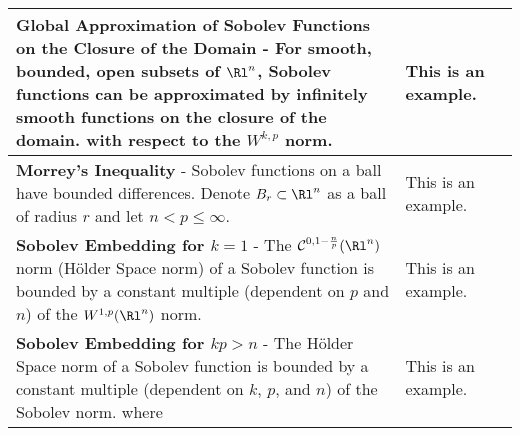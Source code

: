 \begin{longtable}{|*{3}{>{\centering\arraybackslash}p{}|}}
            \textbf{Global Approximation of Sobolev Functions on the Closure of the Domain} - For smooth, bounded, open subsets of $\Rl^n$, Sobolev functions can be approximated by infinitely smooth functions on the closure of the domain. \newline {$\!\begin{gathered} \mathcal{C}^\infty(\overline{\Omega}) \qquad \text{is dense in} \qquad W^{k,p}(\Omega) \end{gathered}$} \newline with respect to the $W^{k,p}$ norm. & This is an example. \\[6pt] \hline
            
            \textbf{Morrey's Inequality} - Sobolev functions on a ball have bounded differences.  Denote $B_r \subset \Rl^n$ as a ball of radius $r$ and let $n < p \leq \infty$. \newline {$\!\begin{gathered} \abs{u(x) - u(y)} \leq C \abs{x - y}^{1 - \frac{n}{p}}\norm{D u}_{L^p(B_r)} \end{gathered}$} & This is an example. \\[6pt] \hline
            
            \textbf{Sobolev Embedding for $k = 1$} - The $\mathcal{C}^{0,1 - \frac{n}{p}}(\Rl^n)$ norm (H\"{o}lder Space norm) of a Sobolev function is bounded by a constant multiple (dependent on $p$ and $n$) of the $W^{1,p}(\Rl^n)$ norm. \newline {$\!\begin{gathered} \norm{u}_{\mathcal{C}^{0, 1 - \frac{n}{p}}(\Rl^n)} \leq C\norm{u}_{W^{1,p}(\Rl^n)} \end{gathered}$} & This is an example. \\[6pt] \hline
                        
            \textbf{Sobolev Embedding for $kp > n$} - The H\"{o}lder Space norm of a Sobolev function is bounded by a constant multiple (dependent on $k$, $p$, and $n$) of the Sobolev norm. \newline {$\!\begin{gathered} \norm{u}_{\mathcal{C}^{k - \qty[\frac{n}{p}] - 1, \gamma}(\Rl^n)} \leq C \norm{u}_{W^{k,p}(\Rl^n)} \end{gathered}$} \newline where \newline {$\!\begin{gathered} \gamma = \begin{cases}\qty[\dfrac{n}{p}] + 1 - \dfrac{n}{p} & \text{ if } \dfrac{n}{p} \not\in \mathbb{N},\\[0.4cm] \text{any } \alpha \in \Rl \cap (0,1) & \text{ if } \dfrac{n}{p} \in \mathbb{N}.\end{cases} \end{gathered}$} & This is an example. \\[6pt] \hline


\end{longtable}
